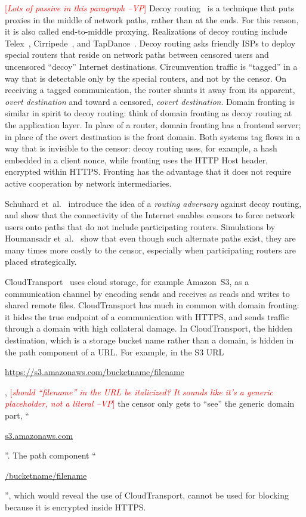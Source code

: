 \documentclass{sig-alternate}
\def\urll#1{\begin{NoHyper}\url{#1}\end{NoHyper}}
\newcommand{\note}[1]{{\textcolor{red}{[\textit{#1}]}}}
\newcommand{\vp}[1]{\note{#1 --VP}}
\begin{document}
\vp{Lots of passive in this paragraph}
Decoy routing~\cite{decoyrouting}
is a technique that puts
proxies in the middle of network paths, rather than at the ends.
For this reason, it is also called end-to-middle proxying.
Realizations of decoy routing include Telex~\cite{telex},
Cirripede~\cite{cirripede}, and TapDance~\cite{tapdance}.
Decoy routing asks friendly ISPs to deploy special routers that reside
on network paths between censored users and uncensored ``decoy'' Internet destinations.
Circumvention traffic is ``tagged'' in a way that is detectable only
by the special routers, and not by the censor.
On receiving a tagged communication, the router shunts it away from its apparent, \emph{overt destination}
and toward a censored, \emph{covert destination}.
Domain fronting is similar in spirit to decoy routing:
think of domain fronting as decoy routing at the application layer.
In place of a router, domain fronting has a frontend server;
in place of the overt destination is the front domain.
Both systems tag flows in a way that is invisible to the censor:
decoy routing uses, for example, a hash embedded in a client nonce,
while fronting uses the HTTP Host header, encrypted within HTTPS.
Fronting has the advantage that it does not require active cooperation by network intermediaries.

Schuhard et~al.~\cite{ccs2012-decoys}
introduce the idea of a \emph{routing adversary} against decoy routing,
and show that the connectivity of the Internet enables
censors to force network users onto paths that do not include participating routers.
Simulations by Houmansadr et~al.~\cite{nodirectionhome}
show that even though such alternate paths exist,
they are many times more costly to the censor,
especially when participating routers are placed strategically.

CloudTransport~\cite{cloudtransport} uses cloud storage, for example Amazon~S3,
as a communication channel by encoding sends and receives as reads and writes to shared remote files.
CloudTransport has much in common with domain fronting:
it hides the true endpoint of a communication with HTTPS,
and sends traffic through a domain with high collateral damage.
In CloudTransport, the hidden destination, which is a storage bucket name rather than a domain,
is hidden in the path component of a URL.
For example, in the S3 URL
\urll{https://s3.amazonaws.com/bucketname/filename},
\vp{should ``filename'' in the URL be italicized?  It sounds like it's
a generic placeholder, not a literal}
the censor only gets to ``see'' the generic domain part, ``\urll{s3.amazonaws.com}''.
The path component ``\urll{/bucketname/filename}'',
which would reveal the use of CloudTransport,
cannot be used for blocking because it is encrypted inside HTTPS.
\end{document}
